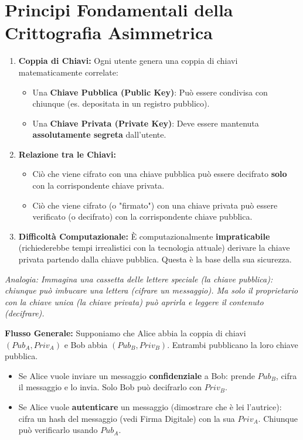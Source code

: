 \documentclass{article}
\begin{document}
\section{Principi Fondamentali della Crittografia Asimmetrica}
\begin{enumerate}[label=\arabic*.]
    \item \textbf{Coppia di Chiavi:} Ogni utente genera una coppia di chiavi matematicamente correlate:
    \begin{itemize}
        \item Una \textbf{Chiave Pubblica (Public Key)}: Può essere condivisa con chiunque (es. depositata in un registro pubblico).
        \item Una \textbf{Chiave Privata (Private Key)}: Deve essere mantenuta \textbf{assolutamente segreta} dall'utente.
    \end{itemize}
    \item \textbf{Relazione tra le Chiavi:}
    \begin{itemize}
        \item Ciò che viene cifrato con una chiave pubblica può essere decifrato \textbf{solo} con la corrispondente chiave privata.
        \item Ciò che viene cifrato (o "firmato") con una chiave privata può essere verificato (o decifrato) con la corrispondente chiave pubblica.
    \end{itemize}
    \item \textbf{Difficoltà Computazionale:} È computazionalmente \textbf{impraticabile} (richiederebbe tempi irrealistici con la tecnologia attuale) derivare la chiave privata partendo dalla chiave pubblica. Questa è la base della sua sicurezza.
\end{enumerate}
\textit{Analogia: Immagina una cassetta delle lettere speciale (la chiave pubblica): chiunque può imbucare una lettera (cifrare un messaggio). Ma solo il proprietario con la chiave unica (la chiave privata) può aprirla e leggere il contenuto (decifrare).}

\textbf{Flusso Generale:}
Supponiamo che Alice abbia la coppia di chiavi $(Pub_A, Priv_A)$ e Bob abbia $(Pub_B, Priv_B)$.
Entrambi pubblicano la loro chiave pubblica.
\begin{itemize}
    \item Se Alice vuole inviare un messaggio \textbf{confidenziale} a Bob: prende $Pub_B$, cifra il messaggio e lo invia. Solo Bob può decifrarlo con $Priv_B$.
    \item Se Alice vuole \textbf{autenticare} un messaggio (dimostrare che è lei l'autrice): cifra un hash del messaggio (vedi Firma Digitale) con la sua $Priv_A$. Chiunque può verificarlo usando $Pub_A$.
\end{itemize}
\end{document}
